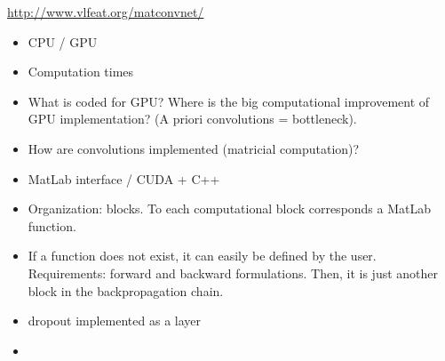 \url{http://www.vlfeat.org/matconvnet/}
\cite{arXiv:1412.4564}

\begin{itemize}
 \item CPU / GPU
 \item Computation times
 \item What is coded for GPU? Where is the big computational improvement of GPU implementation? (A priori convolutions = bottleneck). 
 \item How are convolutions implemented (matricial computation)?
 \item MatLab interface / CUDA + C++
 \item Organization: blocks. To each computational block corresponds a MatLab function. 
 \item If a function does not exist, it can easily be defined by the user. Requirements: forward and backward formulations. Then, it is just another 
block in the backpropagation chain. 
 \item dropout implemented as a layer
 \item 
\end{itemize}